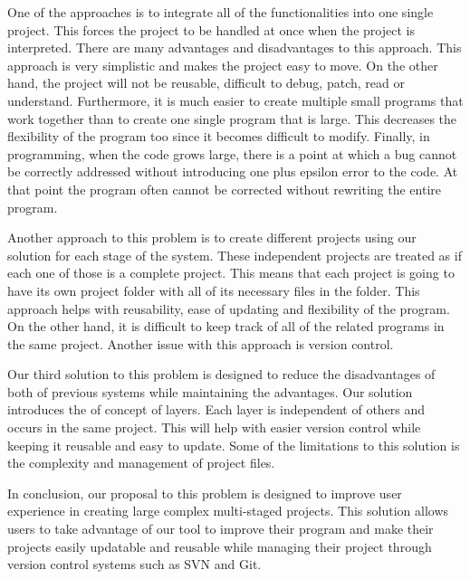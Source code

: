 \documentclass[journal,10pt,onecolumn,compsoc]{IEEEtran} \usepackage[margin=1.0in]{geometry} \usepackage{pdfpages} \usepackage{graphicx}
\begin{document}
\noindent One of the approaches is to integrate all of the functionalities into one single project. 
This forces the project to be handled at once when the project is interpreted. 
There are many advantages and disadvantages to this approach. 
This approach is very simplistic and makes the project easy to move. 
On the other hand, the project will not be reusable, difficult to debug, patch, read or understand. 
Furthermore, it is much easier to create multiple small programs that work together than to create one single  program that is large. 
This decreases the flexibility of the program too since it becomes difficult to modify. 
Finally, in programming, when the code grows large, there is a point at which a bug cannot be correctly addressed without introducing one plus epsilon error to the code. \cite{criticalmass}
At that point the program often cannot be corrected without rewriting the entire program.

\noindent Another approach to this problem is to create different projects using our solution for each stage of the system. 
These independent projects are treated as if each one of those is a complete project. 
This means that each project is going to have its own project folder with all of its necessary files in the folder. 
This approach helps with reusability, ease of updating and flexibility of the program. 
On the other hand, it is difficult to keep track of all of the related programs in the same project. 
Another issue with this approach is version control. 

\noindent Our third solution to this problem is designed to reduce the disadvantages of both of previous systems while maintaining the advantages. 
Our solution introduces the of concept of layers. 
Each layer is independent of others and occurs in the same project. 
This will help with easier version control while keeping it reusable and easy to update. 
Some of the limitations to this solution is the complexity and management of project files. 

\noindent In conclusion, our proposal to this problem is designed to improve user experience in creating large complex multi-staged projects. 
This solution allows users to take advantage of our tool to improve their program and make their projects easily updatable and reusable while managing their project through version control systems such as SVN and Git.
\newpage
\end{document}
